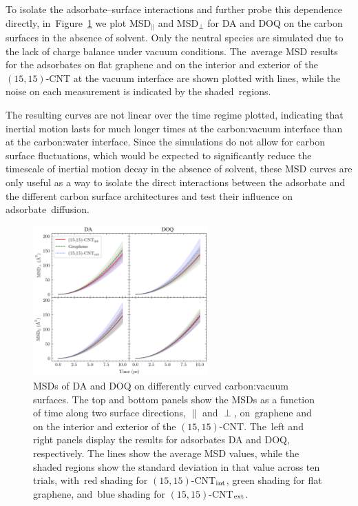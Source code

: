 \documentclass[molecules,article,accept,pdftex,moreauthors]{Definitions/mdpi}
\begin{document}
To isolate the adsorbate--surface interactions and further probe this dependence directly, in~Figure~\ref{fig:D-nosolvent} we plot MSD$_{\parallel}$ and MSD$_{\perp}$ for DA and DOQ on the carbon surfaces in the absence of solvent. Only the neutral species are simulated due to the lack of charge balance under vacuum conditions. The~average MSD results for the adsorbates on flat graphene and on the interior and exterior of the $(15,15)$-CNT at the vacuum interface are shown plotted with lines, while the noise on each measurement is indicated by the shaded~regions. 


      
The resulting curves are not linear over the time regime plotted, indicating that inertial motion lasts for much longer times at the carbon:vacuum interface than at the carbon:water interface. Since the simulations do not allow for carbon surface fluctuations, which would be expected to significantly reduce the timescale of inertial motion decay in the absence of solvent, these MSD curves are only useful as a way to isolate the direct interactions between the adsorbate and the different carbon surface architectures and test their influence on adsorbate~diffusion.
      
\begin{figure}[H]
    \includegraphics[width=0.6\textwidth]{Figures/MSD_trajs_no_solvent/msd_trajs.png}
    \caption{MSDs of DA and DOQ on differently curved carbon:vacuum surfaces. The top and bottom panels show the MSDs as a function of time along two surface directions, $\parallel$ and $\perp$, on~graphene and on the interior and exterior of the $(15,15)$-CNT. The~left and right panels display the results for adsorbates DA and DOQ, respectively. 
    The lines show the average MSD values, while the shaded regions show the standard deviation in that value across ten trials, with~red shading for $(15,15)$-CNT$_{\rm int}$, green shading for flat graphene, and~blue shading for $(15,15)$-CNT$_{\rm ext}$.}
    \label{fig:D-nosolvent}
\end{figure}
\end{document}
